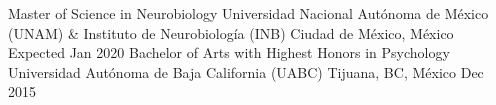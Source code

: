 \begin{cventries}
    \cventry
        {Master of Science in Neurobiology}
        {Universidad Nacional Autónoma de México (UNAM) \& Instituto de
        Neurobiología (INB)}
        {Ciudad de México, México}
        {Expected Jan 2020}
        {}
    \cventry
        {Bachelor of Arts with Highest Honors in Psychology}
        {Universidad Autónoma de Baja California (UABC)}
        {Tijuana, BC, México}
        {Dec 2015}
        {}
\end{cventries}
